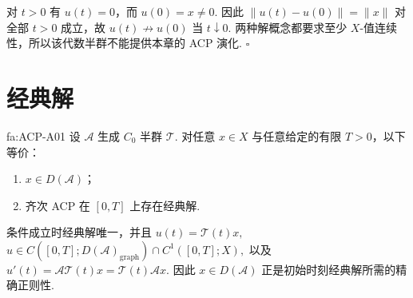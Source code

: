 \begin{FAProof}
对 \(\displaystyle t>0\) 有 \(\displaystyle u(t)=0\)，而 \(\displaystyle u(0)=x\neq0\). 因此 \(\displaystyle\|u(t)-u(0)\|=\|x\|\) 对全部 \(\displaystyle t>0\) 成立，故 \(\displaystyle u(t)\not\to u(0)\) 当 \(\displaystyle t\downarrow0\). 两种解概念都要求至少 \(\displaystyle X\)-值连续性，所以该代数半群不能提供本章的 ACP 演化.
\hfill\(\square\)
\end{FAProof}

\section{经典解}\label{sec:ii11-classical}

\begin{FATheorem}{fa:ACP-A01}
设 \(\displaystyle\mathcal A\) 生成 \(\displaystyle C_0\) 半群 \(\displaystyle\mathcal T\). 对任意 \(\displaystyle x\in X\) 与任意给定的有限 \(\displaystyle T>0\)，以下等价：
\begin{enumerate}[label=\textup{(\roman*)}]
\item \(\displaystyle x\in D(\mathcal A)\)；
\item 齐次 ACP 在 \(\displaystyle[0,T]\) 上存在经典解.
\end{enumerate}
条件成立时经典解唯一，并且 \(\displaystyle u(t)=\mathcal T(t)x,\) \(\displaystyle u\in C([0,T];D(\mathcal A)_{\mathrm{graph}})\cap C^1([0,T];X),\)
以及 \(\displaystyle u'(t) = \mathcal A\mathcal T(t)x = \mathcal T(t)\mathcal Ax.\)
因此 \(\displaystyle x\in D(\mathcal A)\) 正是初始时刻经典解所需的精确正则性.
\end{FATheorem}

